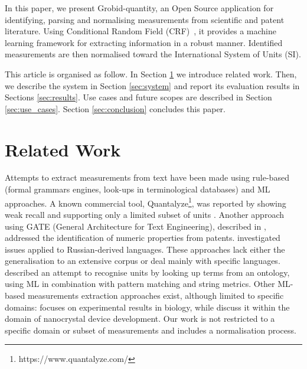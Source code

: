 \documentclass[sigconf]{acmart}
\begin{document}
In this paper, we present Grobid-quantity, an Open Source application \cite{grobid-quantities} for identifying, parsing and normalising measurements from scientific and patent literature. Using Conditional Random Field (CRF)~\cite{lafferty2001conditional}, it provides a machine learning framework for extracting information in a robust manner. Identified measurements are then normalised toward the International System of Units (SI). 

This article is organised as follow. In Section \ref{sec:related_work} we introduce related work. Then, we describe the system in Section \ref{sec:system} and report its evaluation results in Sections \ref{sec:results}. Use cases and future scopes are described in Section \ref{sec:use_cases}. Section \ref{sec:conclusion} concludes this paper.

\section{Related Work}
\label{sec:related_work}
Attempts to extract measurements from text have been made using rule-based (formal grammars engines, look-ups in terminological databases) and ML approaches. A known commercial tool, Quantalyze\footnote{https://www.quantalyze.com/}, was reported by \cite{hundman2017measurement} showing weak recall and supporting only a limited subset of units \cite{aras2014applications}. Another approach using GATE (General Architecture for Text Engineering), described in \cite{agatonovic2008large}, addressed the identification of numeric properties from patents. \cite{am2013processing} investigated issues applied to Russian-derived languages. These approaches lack either the generalisation to an extensive corpus or deal mainly with specific languages. \cite{berrahou2013extract} described an attempt to recognise units by looking up terms from an ontology, using ML in combination with pattern matching and string metrics. Other ML-based measurements extraction approaches exist, although limited to specific domains: \cite{kang_extracting_2013} focuses on experimental results in biology, while \cite{dieb2015framework} discuss it within the domain of nanocrystal device development. Our work is not restricted to a specific domain or subset of measurements and includes a normalisation process. 
\end{document}
